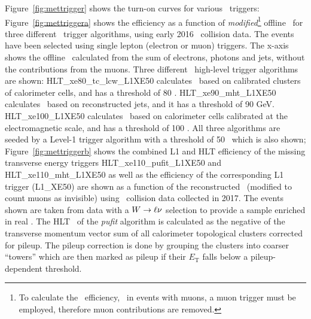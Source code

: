 				Figure~\ref{fig:mettrigger} shows the turn-on curves for various \met\ triggers: Figure~\ref{fig:mettriggera} shows the efficiency as a function of \textit{modified}\footnote{To calculate the \met\ efficiency, \eg\ in events with muons, a muon trigger must be employed, therefore muon contributions are removed.} offline \met\ for three different \met\ trigger algorithms, using early 2016 \pp\ collision data. The events have been selected using single lepton (electron or muon) triggers. The x-axis shows the offline \met\ calculated from the sum of electrons, photons and jets, without the contributions from the muons. Three different \met\ high-level trigger algorithms are shown: HLT\_xe80\_tc\_lcw\_L1XE50 calculates \met\ based on calibrated clusters of calorimeter cells, and has a threshold of 80 \GeV. HLT\_xe90\_mht\_L1XE50 calculates \met\ based on reconstructed jets, and it has a threshold of 90 GeV. HLT\_xe100\_L1XE50 calculates \met\ based on calorimeter cells calibrated at the electromagnetic scale, and has a threshold of 100 \GeV. All three algorithms are seeded by a Level-1 trigger algorithm with a threshold of 50 \GeV\ which is also shown; Figure~\ref{fig:mettriggerb} shows the combined L1 and HLT efficiency of the missing transverse energy triggers HLT\_xe110\_pufit\_L1XE50 and HLT\_xe110\_mht\_L1XE50 as well as the efficiency of the corresponding L1 trigger (L1\_XE50) are shown as a function of the reconstructed \met\ (modified to count muons as invisible) using \pp\ collision data collected in 2017. The events shown are taken from data with a $W \rightarrow \ell \nu$ selection to provide a sample enriched in real \met. The HLT \met\ of the \textit{pufit} algorithm is calculated as the negative of the transverse momentum vector sum of all calorimeter topological clusters corrected for pileup. The pileup correction is done by grouping the clusters into coarser “towers” which are then marked as pileup if their $E_\mathrm{T}$ falls below a pileup-dependent threshold.

